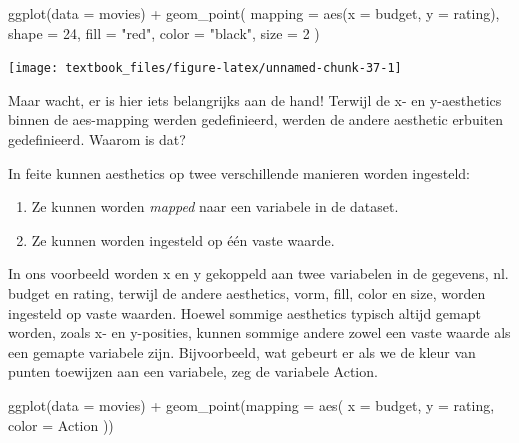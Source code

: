 \documentclass[]{tufte-book}
\newenvironment{Shaded}{}{}
\newcommand{\AttributeTok}[1]{\textcolor[rgb]{0.49,0.56,0.16}{#1}}
\newcommand{\DecValTok}[1]{\textcolor[rgb]{0.25,0.63,0.44}{#1}}
\newcommand{\FunctionTok}[1]{\textcolor[rgb]{0.02,0.16,0.49}{#1}}
\newcommand{\NormalTok}[1]{#1}
\newcommand{\SpecialCharTok}[1]{\textcolor[rgb]{0.25,0.44,0.63}{#1}}
\newcommand{\StringTok}[1]{\textcolor[rgb]{0.25,0.44,0.63}{#1}}
\providecommand{\tightlist}{%
  \setlength{\itemsep}{0pt}\setlength{\parskip}{0pt}}
\begin{document}
\begin{Shaded}
\begin{Highlighting}[]
\FunctionTok{ggplot}\NormalTok{(}\AttributeTok{data =}\NormalTok{ movies) }\SpecialCharTok{+}
  \FunctionTok{geom\_point}\NormalTok{(}
    \AttributeTok{mapping =} \FunctionTok{aes}\NormalTok{(}\AttributeTok{x =}\NormalTok{ budget, }\AttributeTok{y =}\NormalTok{ rating),}
    \AttributeTok{shape =} \DecValTok{24}\NormalTok{,}
    \AttributeTok{fill =} \StringTok{"red"}\NormalTok{,}
    \AttributeTok{color =} \StringTok{"black"}\NormalTok{,}
    \AttributeTok{size =} \DecValTok{2}
\NormalTok{  )}
\end{Highlighting}
\end{Shaded}

\texttt{[image: textbook\_files/figure-latex/unnamed-chunk-37-1]}

Maar wacht, er is hier iets belangrijks aan de hand! Terwijl de x- en y-aesthetics binnen de aes-mapping werden gedefinieerd, werden de andere aesthetic erbuiten gedefinieerd. Waarom is dat?

In feite kunnen aesthetics op twee verschillende manieren worden ingesteld:

\begin{enumerate}
\def\labelenumi{\arabic{enumi}.}
\tightlist
\item
  Ze kunnen worden \emph{mapped} naar een variabele in de dataset.
\item
  Ze kunnen worden ingesteld op één vaste waarde.
\end{enumerate}

In ons voorbeeld worden x en y gekoppeld aan twee variabelen in de gegevens, nl. budget en rating, terwijl de andere aesthetics, vorm, fill, color en size, worden ingesteld op vaste waarden. Hoewel sommige aesthetics typisch altijd gemapt worden, zoals x- en y-posities, kunnen sommige andere zowel een vaste waarde als een gemapte variabele zijn. Bijvoorbeeld, wat gebeurt er als we de kleur van punten toewijzen aan een variabele, zeg de variabele Action.

\begin{Shaded}
\begin{Highlighting}[]
\FunctionTok{ggplot}\NormalTok{(}\AttributeTok{data =}\NormalTok{ movies) }\SpecialCharTok{+}
  \FunctionTok{geom\_point}\NormalTok{(}\AttributeTok{mapping =} \FunctionTok{aes}\NormalTok{(}
    \AttributeTok{x =}\NormalTok{ budget,}
    \AttributeTok{y =}\NormalTok{ rating,}
    \AttributeTok{color =}\NormalTok{ Action}
\NormalTok{  ))}
\end{Highlighting}
\end{Shaded}
\end{document}
